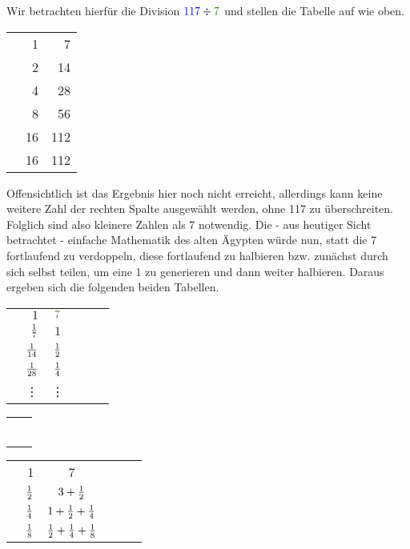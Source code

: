 	\begin{bsp}
		Wir betrachten hierfür die Division $\textcolor{blue}{117} \div \textcolor{OliveGreen}{7}$ und stellen die Tabelle auf wie oben.
		\begin{center}
			\begin{tabular}{r r r}
				& 1 & \textcolor{OliveGreen}{7}\\
				& 2 & 14\\
				& 4 & 28\\
				& 8 & 56\\
				\checkmark & 16 & 112\\ \hline
				\ding{53}& 16 & 112
			\end{tabular}
		\end{center}
		Offensichtlich ist das Ergebnis hier noch nicht erreicht, allerdings kann keine weitere Zahl der rechten Spalte ausgewählt werden, ohne 117 zu überschreiten. Folglich sind also kleinere Zahlen als 7 notwendig. Die - aus heutiger Sicht betrachtet - einfache Mathematik des alten Ägypten würde nun, statt die 7 fortlaufend zu verdoppeln, diese fortlaufend zu halbieren bzw. zunächst durch sich selbst teilen, um eine 1 zu generieren und dann weiter halbieren. Daraus ergeben sich die folgenden beiden Tabellen.\\
		\begin{table}[H]
			\centering
			\begin{tabular}{Sr Sr Sr}
				& $1$ & $\textcolor{OliveGreen}{7}$\\
				& $\frac{1}{7}$ & $1$\\
				& $\frac{1}{14}$ & $\frac{1}{2}$\\
				& $\frac{1}{28}$ & $\frac{1}{4}$\\
				& \vdots & \vdots \\
			\end{tabular}
			\qquad \quad
			\begin{tabular}{c | c}
					&\\&\\&\\&\\&\\&\\
			\end{tabular}
			\qquad
			\begin{tabular}[h]{Sr Sr Sr}
				& 1 & \textcolor{OliveGreen}{7}\\
				& $\frac{1}{2}$ & $3+\frac{1}{2}$\\
				& $\frac{1}{4}$ & $1+\frac{1}{2}+\frac{1}{4}$\\
				& $\frac{1}{8}$ & $\frac{1}{2}+\frac{1}{4}+\frac{1}{8}$\\

\end{tabular}
\end{table}
\end{bsp}
